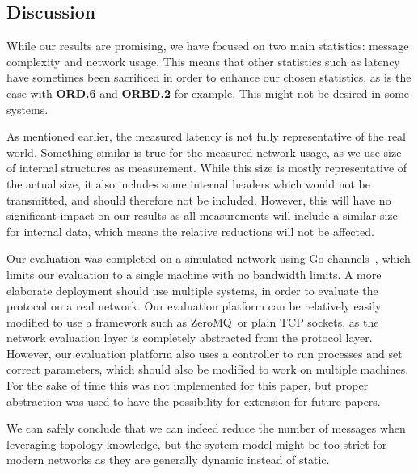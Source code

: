 \subsection{Discussion}

While our results are promising, we have focused on two main statistics: message complexity and network usage. This means that other statistics such as latency have sometimes been sacrificed in order to enhance our chosen statistics, as is the case with \textbf{ORD.6} and \textbf{ORBD.2} for example. This might not be desired in some systems.

As mentioned earlier, the measured latency is not fully representative of the real world. Something similar is true for the measured network usage, as we use size of internal structures as measurement. While this size is mostly representative of the actual size, it also includes some internal headers which would not be transmitted, and should therefore not be included. However, this will have no significant impact on our results as all measurements will include a similar size for internal data, which means the relative reductions will not be affected.

Our evaluation was completed on a simulated network using Go channels~\cite{channels}, which limits our evaluation to a single machine with no bandwidth limits. A more elaborate deployment should use multiple systems, in order to evaluate the protocol on a real network. Our evaluation platform can be relatively easily modified to use a framework such as ZeroMQ~\citationneeded or plain TCP sockets, as the network evaluation layer is completely abstracted from the protocol layer. However, our evaluation platform also uses a controller to run processes and set correct parameters, which should also be modified to work on multiple machines. For the sake of time this was not implemented for this paper, but proper abstraction was used to have the possibility for extension for future papers.

We can safely conclude that we can indeed reduce the number of messages when leveraging topology knowledge, but the system model might be too strict for modern networks as they are generally dynamic instead of static. 